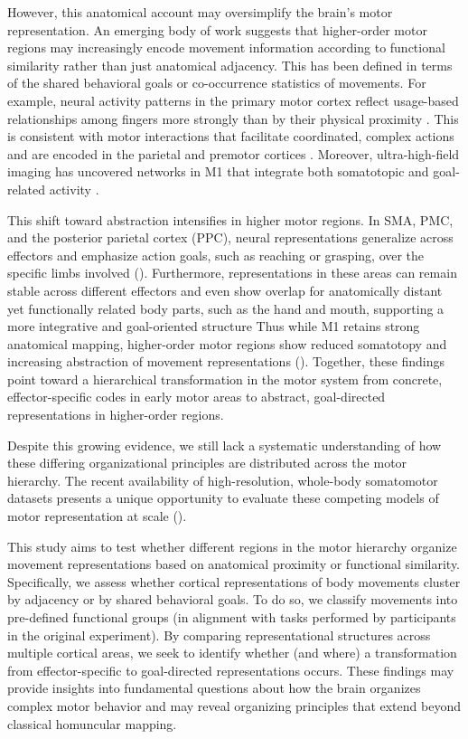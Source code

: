 \documentclass{article}
\begin{document}
However, this anatomical account may oversimplify the brain's motor representation. An emerging body of work suggests that higher-order motor regions may increasingly encode movement information according to functional similarity rather than just anatomical adjacency. This has been defined in terms of the shared behavioral goals or co-occurrence statistics of movements. For example, neural activity patterns in the primary motor cortex reflect usage-based relationships among fingers more strongly than by their physical proximity \citep{ejaz2015}. This is consistent with motor interactions that facilitate coordinated, complex actions and are encoded in the parietal and premotor cortices \citep{Graziano2002}. Moreover, ultra-high-field imaging has uncovered networks in M1 that integrate both somatotopic and goal-related activity \citep{Gordon2023}.

This shift toward abstraction intensifies in higher motor regions. In SMA, PMC, and the posterior parietal cortex (PPC), neural representations generalize across effectors and emphasize action goals, such as reaching or grasping, over the specific limbs involved (\citep{Gallivan2013, turella2014, Filimon2009}). Furthermore, representations in these areas can remain stable across different effectors and even show overlap for anatomically distant yet functionally related body parts, such as the hand and mouth, supporting a more integrative and goal-oriented structure  \citep{Graziano2002} Thus while M1 retains strong anatomical mapping, higher-order motor regions show reduced somatotopy and increasing abstraction of movement representations (\citep{Gallivan2013}). Together, these findings point toward a hierarchical transformation in the motor system from concrete, effector-specific codes in early motor areas to abstract, goal-directed representations in higher-order regions. 

Despite this growing evidence, we still lack a systematic understanding of how these differing organizational principles are distributed across the motor hierarchy. The recent availability of high-resolution, whole-body somatomotor datasets presents a unique opportunity to evaluate these competing models of motor representation at scale (\cite{Donahue2018}).

This study aims to test whether different regions in the motor hierarchy organize movement representations based on anatomical proximity or functional similarity. Specifically, we assess whether cortical representations of body movements cluster by adjacency or by shared behavioral goals. To do so, we classify movements into pre-defined functional groups (in alignment with tasks performed by participants in the original experiment). By comparing representational structures across multiple cortical areas, we seek to identify whether (and where) a transformation from effector-specific to goal-directed representations occurs. These findings may provide insights into fundamental questions about how the brain organizes complex motor behavior and may reveal organizing principles that extend beyond classical homuncular mapping.
\end{document}
